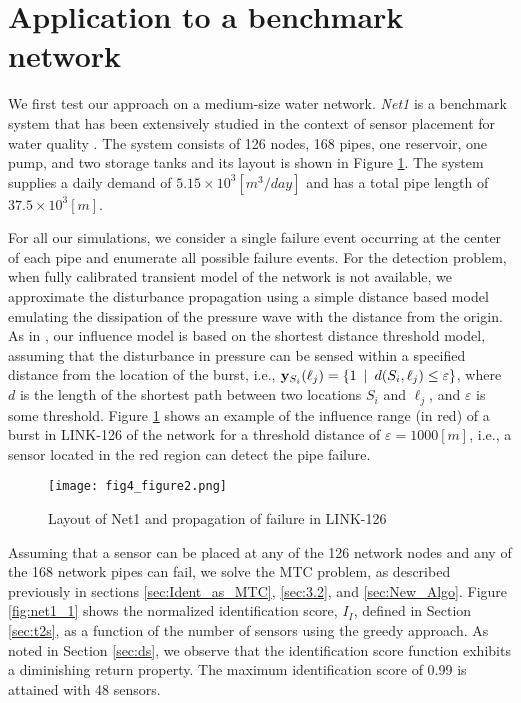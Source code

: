 \documentclass[twocolumn]{autart}
\begin{document}
\section{Application to a benchmark network}
\label{sec:applications}\vspace{-0.35cm}
We first test our approach on a medium-size water network. \textit{Net1} is a benchmark system that has been extensively studied in the context of sensor placement for water quality  \cite{ostfeld}. The system consists of 126 nodes, 168 pipes, one reservoir, one pump, and two storage tanks and its layout is shown in Figure \ref{fig:net1}. The system supplies a daily demand of $5.15\times10^3 [m^3/day]$ and has a total pipe length of $37.5\times10^3[m]$.  \vspace{-0.35cm}

For all our simulations, we consider a single failure event occurring at the center of each pipe and enumerate all possible failure events. For the detection problem, when fully calibrated transient model of the network is not available, we approximate the disturbance propagation using a simple distance based model emulating the dissipation of the pressure wave with the distance from the origin. As in \cite{fd:deshpande}, our influence model is based on the shortest distance threshold model, assuming that the disturbance in pressure can be sensed within a specified distance from the location of the burst, i.e., $\mathbf{y}_{S_i}(\ell_j)= \{ 1 \hspace{0.5em} | \hspace{0.5em} d (S_i,\ell_j) \leq \varepsilon \}$, where $d$ is the length of the shortest path between two locations $S_i$ and $\ell_j$, and $\varepsilon$ is some threshold.  Figure \ref{fig:net1} shows an example of the influence range (in red) of a burst in LINK-126 of the network for a threshold distance of $\varepsilon = 1000 [m]$, i.e., a sensor located in the red region can detect the pipe failure.


\begin{figure}[ht]
\centering
\texttt{[image: fig4\_figure2.png]}
\caption{Layout of Net1 and propagation of failure in LINK-126}
\label{fig:net1}
\end{figure}
Assuming that a sensor can be placed at any of the 126 network nodes and any of the 168 network pipes can fail, we solve the MTC problem, as described previously in sections \ref{sec:Ident_as_MTC}, \ref{sec:3.2}, and \ref{sec:New_Algo}.  
Figure \ref{fig:net1_1} shows the normalized identification score, $I_I$, defined in Section \ref{sec:t2s}, as a function of the number of sensors using the greedy approach. 
As noted in Section \ref{sec:ds}, we observe that the identification score function exhibits a diminishing return property. The maximum identification score of 0.99 is attained with 48 sensors.
\end{document}
